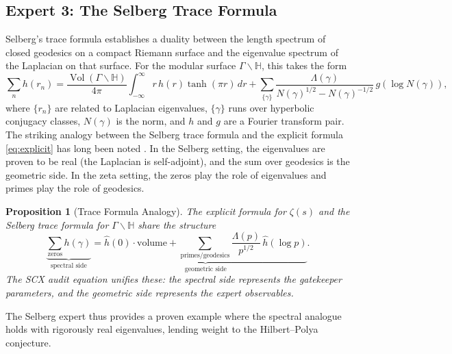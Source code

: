 \documentclass[12pt,a4paper]{article}
\newtheorem{proposition}[theorem]{Proposition}
\theoremstyle{remark}
\DeclareMathOperator{\Vol}{Vol}
\begin{document}
\subsection{Expert 3: The Selberg Trace Formula}
\label{sec:expert3}
Selberg's trace formula \cite{Selberg1956} establishes a duality between
the length spectrum of closed geodesics on a compact Riemann surface and
the eigenvalue spectrum of the Laplacian on that surface. For the modular
surface $\Gamma\backslash\mathbb{H}$, this takes the form
\[
\sum_{n} h(r_n) = \frac{\Vol(\Gamma\backslash\mathbb{H})}{4\pi}
\int_{-\infty}^{\infty} r\, h(r) \tanh(\pi r)\, dr
+ \sum_{\{\gamma\}} \frac{\Lambda(\gamma)}{N(\gamma)^{1/2} - N(\gamma)^{-1/2}}
\, g(\log N(\gamma)),
\]
where $\{r_n\}$ are related to Laplacian eigenvalues, $\{\gamma\}$ runs
over hyperbolic conjugacy classes, $N(\gamma)$ is the norm, and $h$ and $g$
are a Fourier transform pair.
The striking analogy between the Selberg trace formula and the explicit
formula \eqref{eq:explicit} has long been noted \cite{Sarnakov1987, IwaniecKowalski2004}.
In the Selberg setting, the eigenvalues are proven to be real (the Laplacian
is self-adjoint), and the sum over geodesics is the geometric side. In
the zeta setting, the zeros play the role of eigenvalues and primes play
the role of geodesics.
\begin{proposition}[Trace Formula Analogy]
\label{prop:trace_analogy}
The explicit formula for $\zeta(s)$ and the Selberg trace formula for
$\Gamma\backslash\mathbb{H}$ share the structure
\[
\underbrace{\sum_{\text{zeros}} h(\gamma)}_{\text{spectral side}}
= \underbrace{\widehat{h}(0) \cdot \text{volume} +
\sum_{\text{primes/geodesics}} \frac{\Lambda(p)}{p^{1/2}} \,
\widehat{h}(\log p)}_{\text{geometric side}}.
\]
The SCX audit equation unifies these: the spectral side represents the
gatekeeper parameters, and the geometric side represents the expert
observables.
\end{proposition}
The Selberg expert thus provides a proven example where the spectral
analogue holds with rigorously real eigenvalues, lending weight to the
Hilbert--Polya conjecture.
\end{document}
